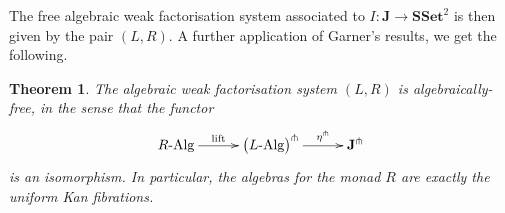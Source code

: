 \documentclass[reqno,10pt,a4paper,oneside]{amsart}
\newcommand{\RAlg}{R\text{-}\mathrm{Alg}}
\newcommand{\LAlg}{L\text{-}\mathrm{Alg}}
\newtheorem{theorem}{Theorem}[section]
\theoremstyle{definition}
\newcommand{\co}{\colon}
\newcommand{\SSet}{\mathbf{SSet}}
\begin{document}
 The free algebraic weak factorisation system associated to $I \co \mathbf{J} \to \SSet^2$ is then
 given by the pair $(L, R)$. A further application of Garner's results, we get the following.
 
 \begin{theorem} The algebraic weak factorisation system $(L, R)$ is algebraically-free, in 
 the sense that the functor
 \[
 \xymatrix@C=1cm{
  \RAlg \ar[r]^-{\textup{lift}} &
    \big( \LAlg \big)^\pitchfork \ar[r]^-{\eta^\pitchfork} &
   \mathbf{J}^\pitchfork}
  \]
  is an isomorphism. In particular, the algebras for the monad $R$ are exactly the
  uniform Kan fibrations.
  \end{theorem} 
 
 
\end{document}
